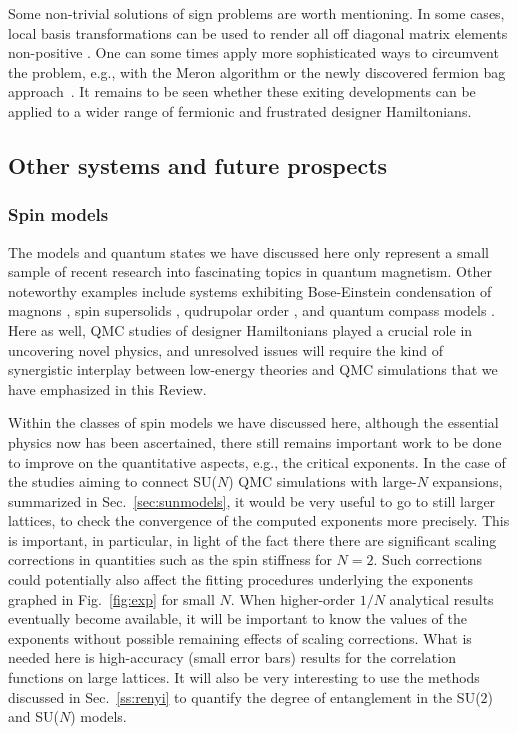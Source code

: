 \documentclass[10pt,pre,aps,twocolumn,showpacs,superscriptaddress,floatfix]{revtex4-1}
\begin{document}
Some non-trivial solutions of sign problems are worth mentioning.
In some cases, local basis transformations can be used to render all off diagonal matrix elements non-positive \cite{Nakamura97}.
One can some times apply more sophisticated ways to circumvent 
the problem, e.g., with the Meron algorithm \cite{Chandrasekharan99} or the newly discovered fermion bag approach~\cite{chandrasekharan2010:fbag}.
It remains to be seen whether these exiting developments can be applied to a wider range of fermionic and frustrated designer Hamiltonians.

\subsection{Other systems and future prospects}

\subsubsection{Spin models}

The models and quantum states we have discussed here only represent a small sample of recent research into fascinating topics in quantum magnetism. Other 
noteworthy examples include systems exhibiting Bose-Einstein condensation of magnons \cite{Nohadani04}, spin supersolids \cite{Sengupta07}, qudrupolar order 
\cite{Harada02b,Harada07}, and quantum compass models \cite{Wenzel08b}. Here as well, QMC studies of designer Hamiltonians played a crucial role 
in uncovering novel physics, and unresolved issues will require the kind of synergistic interplay between low-energy theories and QMC simulations that 
we have emphasized in this Review.

Within the classes of spin models we have discussed here, although the essential physics now has been ascertained, there still remains
important work to be done to improve on the quantitative aspects, e.g., the critical exponents. In the case of the studies aiming to connect
SU($N$) QMC simulations with large-$N$ expansions, summarized in Sec.~\ref{sec:sunmodels}, it would be very useful to go to still larger lattices, 
to check the convergence of the computed exponents more precisely. This is important, in particular, in light of the fact there there are significant scaling 
corrections in quantities such as the spin stiffness for $N=2$. Such corrections could potentially also affect the fitting procedures underlying 
the exponents graphed in Fig.~\ref{fig:exp} for small $N$. When higher-order $1/N$ analytical results eventually become available, it will be important to know 
the values of the exponents without possible remaining effects of scaling corrections. What is needed here is high-accuracy (small error bars) 
results for the correlation functions on large lattices. It will also be very interesting to use the methods discussed in Sec.~\ref{ss:renyi} to quantify 
the degree of entanglement in the SU($2$) and SU($N$) models.
\end{document}
